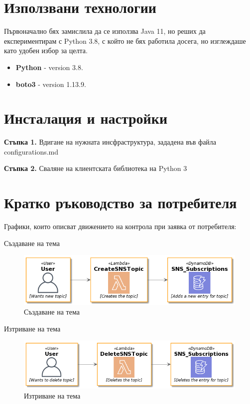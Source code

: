 \documentclass[12pt]{article}
\begin{document}
\section{Използвани технологии}
Първоначално бях замислила да се използва Java 11, но реших да експериментирам с Python 3.8, с който
не бях работила досега, но изглеждаше като удобен избор за целта.
\begin{itemize}
    \item \textbf{Python} - version 3.8.
    
    \item \textbf{boto3} - version 1.13.9.
\end{itemize}


\section{Инсталация и настройки}
\noindent\textbf{Стъпка 1.} Вдигане на нужната инсфраструктура, зададена във файла configurations.md

\medskip

\noindent\textbf{Стъпка 2.} Сваляне на клиентската библиотека на Python 3

\section{Кратко ръководство за потребителя}

\noindent Графики, които описват движението на контрола при заявка от потребителя:

\noindent Създаване на тема

\begin{figure}[h!]
\centering
    \includegraphics[scale=0.4]{topic_creation_flow.png}
    \caption{Създаване на тема}
\end{figure}

\noindent Изтриване на тема

\begin{figure}[h!]
  \centering
      \includegraphics[scale=0.4]{topic_deletion_flow.png}
      \caption{Изтриване на тема}
\end{figure}
\end{document}
